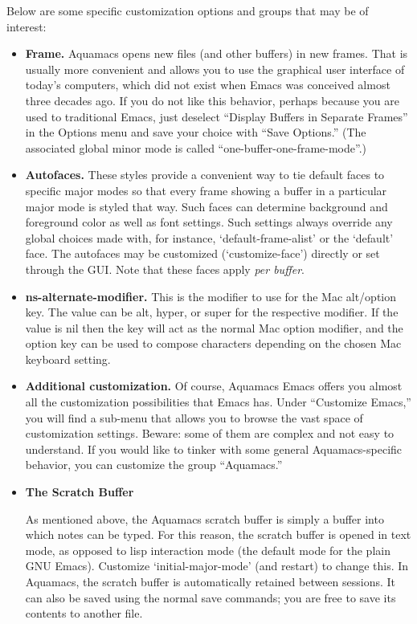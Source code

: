 \documentclass[11pt,letterpaper]{article}
\begin{document}
Below are some specific customization options and groups that may be of interest:

\begin{itemize} 
\item \textbf{Frame.} Aquamacs opens new files (and other buffers) in new frames. That is usually more convenient and allows you to use the graphical user interface of today's computers, which did not exist when Emacs was conceived almost three decades ago. If you do not like this behavior, perhaps because you are used to traditional Emacs, just deselect ``Display Buffers in Separate Frames'' in the Options menu and save your choice with ``Save Options.'' (The associated global minor mode is called ``one-buffer-one-frame-mode''.)

\item \textbf{Autofaces.} These styles provide a convenient way to tie default faces to specific major modes so that every frame showing a buffer in a particular major mode is styled that way. Such faces can  determine background and foreground color as well as font settings.  Such settings always override any global choices made with, for instance, `default-frame-alist' or the `default' face.   The autofaces may be customized (`customize-face') directly or set through the GUI.  Note that these faces apply {\em per buffer}.

\item \textbf{ns-alternate-modifier.} This is  the modifier to use for the Mac alt/option key.  The value can
be alt, hyper, or super for the respective modifier.  If the value is
nil then the key will act as the normal Mac option modifier, and the option
key can be used to compose characters depending on the chosen Mac keyboard
setting. 

\item \textbf{Additional customization.} Of course, Aquamacs Emacs
  offers you almost all the customization  possibilities that Emacs
  has. Under ``Customize Emacs,'' you will find  a sub-menu that
  allows you to browse the vast space of customization
  settings. Beware: some of them are complex and not easy to
  understand. If you would like to tinker with some general Aquamacs-specific
  behavior, you can customize the group ``Aquamacs.'' 

\item \textbf{The Scratch Buffer}

  As mentioned above, the Aquamacs scratch buffer is simply a buffer into which notes can be typed.  For this reason, the scratch buffer is opened in text mode, as opposed to lisp interaction mode (the default mode for the plain GNU Emacs). Customize `initial-major-mode' (and restart) to change this.  In Aquamacs, the scratch buffer is automatically retained between sessions.  It can also be saved using the normal save commands; you are free to save its contents to another file.


\end{itemize}
\end{document}
